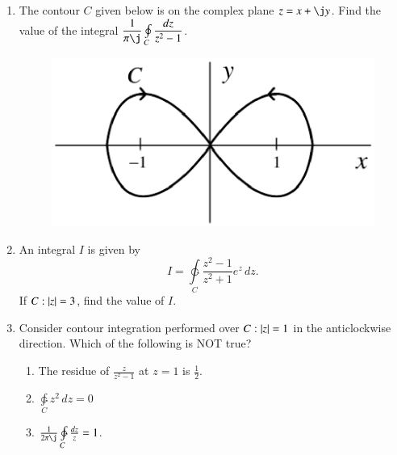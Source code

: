 \documentclass[journal,12pt,twocolumn]{IEEEtran}
\begin{document}
%
%
\renewcommand{\thefigure}{\theenumi}
\begin{enumerate}[1.]
\item The contour $C$ given below is on the complex plane $z = x + \j y$.
Find the value of the integral $\dfrac{1}{\pi\j}\oint\limits_{C}\dfrac{dz}{z^2-1}$.
%
\begin{figure}[!h]
\centering
\includegraphics[width=\columnwidth]{./figs/ec2018.eps}
\caption{}
\label{fig:ec2018}
\end{figure}
\item An integral $I$  is given by 
\begin{equation}
I = \ointctrclockwise\limits_{C}\frac{z^2-1}{z^2+1} e^z\,dz.
\end{equation}
If $C: \left\vert z\right\vert = 3$, find the value of $I$.
\item Consider contour integration performed over $C:\left\vert z\right\vert = 1$ in the anticlockwise direction.  Which of the following is
NOT true?
\begin{enumerate}
\setlength\itemsep{0.5em}
\item The residue of $\frac{z}{z^2-1}$ at $z = 1$ is $\frac{1}{2}$.
\item $\ointctrclockwise\limits_{C}z^2\,dz = 0$
\item $\frac{1}{2\pi\j}\ointctrclockwise\limits_{C}\frac{dz}{z}= 1$.

\end{enumerate}
\end{enumerate}
\end{document}
